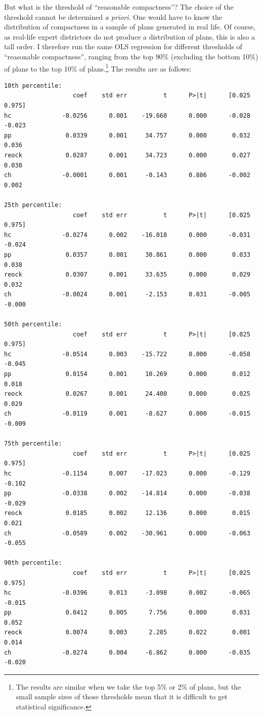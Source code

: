 \documentclass[]{article}
\begin{document}
But what is the threshold of ``reasonable compactness''? The choice of
the threshold cannot be determined \emph{a priori}. One would have to
know the distribution of compactness in a sample of plans generated in
real life. Of course, as real-life expert districtors do not produce a
distribution of plans, this is also a tall order. I therefore run the
same OLS regression for different thresholds of ``reasonable
compactness'', ranging from the top 90\% (excluding the bottom 10\%) of
plans to the top 10\% of plans.\footnote{The results are similar when we
  take the top 5\% or 2\% of plans, but the small sample sizes of those
  thresholds mean that it is difficult to get statistical significance.}
The results are as follows:

\begin{verbatim}
10th percentile:
                   coef    std err          t      P>|t|      [0.025      0.975]
hc              -0.0256      0.001    -19.660      0.000      -0.028      -0.023
pp               0.0339      0.001     34.757      0.000       0.032       0.036
reock            0.0287      0.001     34.723      0.000       0.027       0.030
ch              -0.0001      0.001     -0.143      0.886      -0.002       0.002

25th percentile:
                   coef    std err          t      P>|t|      [0.025      0.975]
hc              -0.0274      0.002    -16.018      0.000      -0.031      -0.024
pp               0.0357      0.001     30.861      0.000       0.033       0.038
reock            0.0307      0.001     33.635      0.000       0.029       0.032
ch              -0.0024      0.001     -2.153      0.031      -0.005      -0.000

50th percentile:
                   coef    std err          t      P>|t|      [0.025      0.975]
hc              -0.0514      0.003    -15.722      0.000      -0.058      -0.045
pp               0.0154      0.001     10.269      0.000       0.012       0.018
reock            0.0267      0.001     24.400      0.000       0.025       0.029
ch              -0.0119      0.001     -8.627      0.000      -0.015      -0.009

75th percentile:
                   coef    std err          t      P>|t|      [0.025      0.975]
hc              -0.1154      0.007    -17.023      0.000      -0.129      -0.102
pp              -0.0338      0.002    -14.814      0.000      -0.038      -0.029
reock            0.0185      0.002     12.136      0.000       0.015       0.021
ch              -0.0589      0.002    -30.961      0.000      -0.063      -0.055

90th percentile:
                   coef    std err          t      P>|t|      [0.025      0.975]
hc              -0.0396      0.013     -3.098      0.002      -0.065      -0.015
pp               0.0412      0.005      7.756      0.000       0.031       0.052
reock            0.0074      0.003      2.285      0.022       0.001       0.014
ch              -0.0274      0.004     -6.862      0.000      -0.035      -0.020
\end{verbatim}
\end{document}
